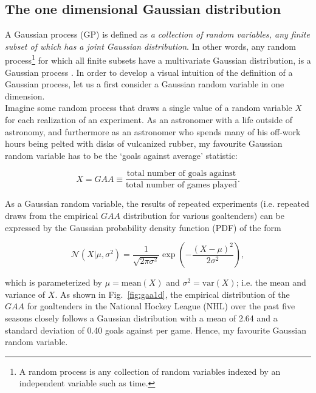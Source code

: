 \subsection{The one dimensional Gaussian distribution}
A Gaussian process (GP) is defined as \emph{a collection of random variables, any
finite subset of which has a joint Gaussian distribution}. In other words,
any random process\footnote{A random process is any collection of random
  variables indexed by an independent variable such as time.} for which all
finite subsets have a multivariate Gaussian distribution, is a Gaussian process
\citep{rasmussen05}. 
In order to develop a visual intuition of the definition of a Gaussian process,
let us a first consider a Gaussian random variable in one dimension. \\

Imagine some random
process that draws a single value of a random variable $X$ for each realization of
an experiment. As an astronomer with a life
outside of astronomy, and furthermore as an astronomer who spends many of his
off-work hours being pelted with %
disks of vulcanized rubber, my favourite
Gaussian random variable has to be the `goals against average' statistic:

\begin{equation}
  X = GAA \equiv \frac{\text{total number of goals against}}{\text{total number of games played}}.
\end{equation}

\noindent As a Gaussian random variable, the results of repeated experiments (i.e.
repeated draws from the empirical $GAA$ distribution for various goaltenders) can
be expressed by the Gaussian probability density function (PDF) of the form

\begin{equation}
  \mathcal{N}(X|\mu,\sigma^2) = \frac{1}{\sqrt{2\pi \sigma^2}} \exp{\left(
    -\frac{(X-\mu)^2}{2\sigma^2} \right)},
  \label{eq:gauss}
\end{equation}

\noindent which is parameterized by $\mu=\text{mean}(X)$ and $\sigma^2=\text{var}(X)$;
i.e. the mean and variance of $X$. As shown in Fig.~\ref{fig:gaa1d}, the empirical
distribution of the $GAA$ for goaltenders in
the National Hockey League (NHL) over the past five seasons closely follows a
Gaussian distribution with a mean of 2.64 and a standard deviation of 0.40 goals
against per game. Hence, my favourite Gaussian random variable. \\

